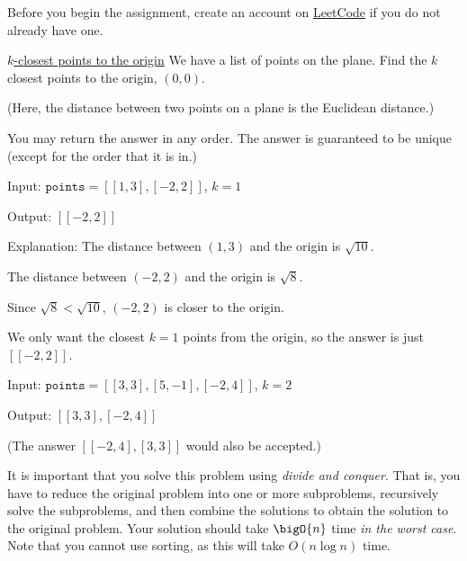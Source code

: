 \documentclass[draft]{article}
\begin{document}
\begin{titlepage}
    Before you begin the assignment, create an account on \href{https://leetcode.com/}{LeetCode} if you do not already have one.

    \begin{problem}{\href{https://leetcode.com/problems/k-closest-points-to-origin/}{$k$-closest points to the origin}}{}
    We have a list of points on the plane.  Find the $k$ closest points to the origin, $(0, 0)$.

    (Here, the distance between two points on a plane is the Euclidean distance.)

    You may return the answer in any order. The answer is guaranteed to be unique (except for the order that it is in.)
    \end{problem}

    \begin{example}{}{}
        Input: $\texttt{points} = [[1,3],[-2,2]]$, $k = 1$

        Output: $[[-2,2]]$

        Explanation:
        The distance between $(1, 3)$ and the origin is $\sqrt{10}$.

        The distance between $(-2, 2)$ and the origin is $\sqrt{8}$.

        Since $\sqrt{8} < \sqrt{10}$, $(-2, 2)$ is closer to the origin.

        We only want the closest $k = 1$ points from the origin, so the answer is just $[[-2,2]]$.
    \end{example}

    \begin{example}{}{}
        Input: $\texttt{points} = [[3,3],[5,-1],[-2,4]]$, $k = 2$

        Output: $[[3,3],[-2,4]]$

        (The answer $[[-2,4],[3,3]]$ would also be accepted.)
    \end{example}

    It is important that you solve this problem using \emph{divide and conquer}. That is, you have to reduce the original problem into one or more subproblems, recursively solve the subproblems, and then combine the solutions to obtain the solution to the original problem. Your solution should take $\bigO{n}$ time \emph{in the worst case}. 
    Note that you cannot use sorting, as this will take $O(n \log n)$ time.


\end{titlepage}
\end{document}

